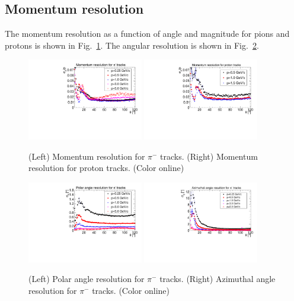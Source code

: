 \subsection{Momentum resolution}

The momentum resolution as a function of angle and magnitude for pions and 
protons is shown in Fig.~\ref{fig:dp_p}.  The angular resolution is shown in 
Fig.~\ref{fig:angle res}.


\begin{figure}[tbp]
\begin{center}
\includegraphics[width=0.45\textwidth]{figures/PionMomentumResolution.pdf}
\includegraphics[width=0.45\textwidth]{figures/ProtonMomentumResolution.pdf}
\caption{\label{fig:dp_p} (Left) Momentum resolution for $\pi^-$ tracks.
(Right) Momentum resolution for proton tracks. (Color online)}
\end{center}
\end{figure}

\begin{figure}[tbp]
\begin{center}
\includegraphics[width=0.45\textwidth]{figures/PionThetaResolution.pdf}
\includegraphics[width=0.45\textwidth]{figures/PionPhiResolution.pdf}
\caption{\label{fig:angle res} (Left) Polar angle resolution for $\pi^-$ tracks.
(Right) Azimuthal angle resolution for $\pi^-$ tracks.
 (Color online)}
\end{center}
\end{figure}


